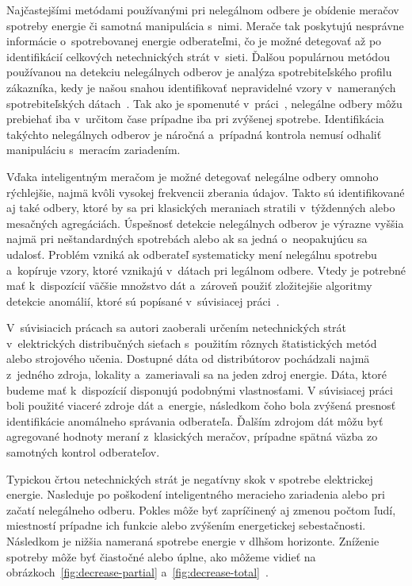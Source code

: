 \documentclass[a4paper,twoside,slovak,12pt,appendix]{article}
\begin{document}
Najčastejšími metódami používanými pri nelegálnom odbere je obídenie meračov
spotreby energie či samotná manipulácia s~nimi. Merače tak poskytujú nesprávne
informácie o~spotrebovanej energie odberateľmi, čo je možné detegovať až po
identifikácií celkových netechnických strát v~sieti. Ďalšou populárnou metódou
používanou na detekciu nelegálnych odberov je analýza spotrebiteľského
profilu zákazníka, kedy je našou snahou identifikovať nepravidelné vzory
v~nameraných spotrebiteľských dátach~\cite{Sahoo2015}. Tak ako je spomenuté
v~práci~\cite{Depuru2012}, nelegálne odbery môžu prebiehať iba v~určitom čase
prípadne iba pri zvýšenej spotrebe. Identifikácia takýchto nelegálnych odberov
je náročná a~prípadná kontrola nemusí odhaliť manipuláciu s~meracím zariadením.

Vďaka inteligentným meračom je možné detegovať nelegálne odbery omnoho
rýchlejšie, najmä kvôli vysokej frekvencii zberania údajov. Takto sú
identifikované aj také odbery, ktoré by sa pri klasických meraniach stratili
v~týždenných alebo mesačných agregáciách. Úspešnosť detekcie nelegálnych odberov
je výrazne vyššia najmä pri neštandardných spotrebách alebo ak sa jedná
o~neopakujúcu sa udalosť. Problém vzniká ak odberateľ systematicky mení
nelegálnu spotrebu a~kopíruje vzory, ktoré vznikajú v~dátach pri legálnom
odbere. Vtedy je potrebné mať k~dispozícií väčšie množstvo dát a~zároveň použiť
zložitejšie algoritmy detekcie anomálií, ktoré sú popísané v~súvisiacej
práci~\cite{Nikovski2013}.

V~súvisiacich prácach sa autori zaoberali určením netechnických strát
v~elektrických distribučných sieťach s~použitím rôznych štatistických metód
alebo strojového učenia. Dostupné dáta od distribútorov pochádzali najmä
z~jedného zdroja, lokality a~zameriavali sa na jeden zdroj energie. Dáta, ktoré
budeme mať k~dispozícií disponujú podobnými vlastnosťami. V súvisiacej
práci~\cite{Coma-Puig2016} boli použité viaceré zdroje dát a~energie, následkom
čoho bola zvýšená presnosť identifikácie anomálneho správania odberateľa.
Ďalším zdrojom dát môžu byť agregované hodnoty meraní z~klasických meračov,
prípadne spätná väzba zo samotných kontrol odberateľov.

Typickou črtou netechnických strát je negatívny skok v spotrebe elektrickej
energie. Nasleduje po poškodení inteligentného meracieho zariadenia alebo pri
začatí nelegálneho odberu. Pokles môže byť zapríčinený aj zmenou počtom ľudí,
miestností prípadne ich funkcie alebo zvýšením energetickej sebestačnosti.
Následkom je nižšia nameraná spotrebe energie v dlhšom horizonte. Zníženie
spotreby môže byť čiastočné alebo úplne, ako môžeme
vidieť na obrázkoch~\ref{fig:decrease-partial}
a~\ref{fig:decrease-total}~\cite{Spiric2015,Trevizan2015}.
\end{document}
